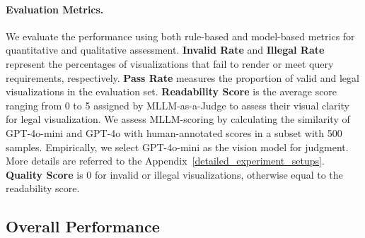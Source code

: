 \paragraph{Evaluation Metrics.}
We evaluate the performance using both rule-based and model-based metrics for quantitative and qualitative assessment. 
    \textbf{Invalid Rate} and \textbf{Illegal Rate} represent the percentages of visualizations that fail to render or meet query requirements, respectively. 
    \textbf{Pass Rate} measures the proportion of valid and legal visualizations in the evaluation set.
    \textbf{Readability Score} is the average score ranging from 0 to 5 assigned by MLLM-as-a-Judge \citep{chen2024mllm, ye2024justice} to assess their visual clarity for legal visualization. We assess MLLM-scoring by calculating the similarity of GPT-4o-mini and GPT-4o with human-annotated scores in a subset with 500 samples. 
    Empirically, we select GPT-4o-mini as the vision model for judgment. More details are referred to the Appendix~\ref{detailed_experiment_setups}.
    \textbf{Quality Score} is 0 for invalid or illegal visualizations, otherwise equal to the readability score.




\subsection{Overall Performance}
\label{results}



